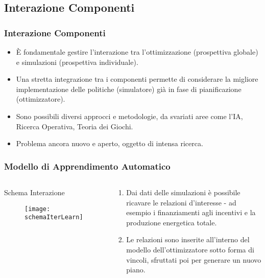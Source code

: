 \documentclass{beamer}
\begin{document}
\subsection{Interazione Componenti}
	\begin{frame}
		\frametitle{Interazione Componenti}
		\begin{itemize}
			\item \`E fondamentale gestire l'interazione tra l'ottimizzazione (prospettiva globale) e simulazioni (prospettiva individuale).
			\item Una stretta integrazione tra i componenti permette di considerare la migliore implementazione delle politiche (simulatore) già in fase di pianificazione (ottimizzatore).
			\item Sono possibili diversi approcci e metodologie, da svariati aree come l'IA, Ricerca Operativa, Teoria dei Giochi.
			\item Problema ancora nuovo e aperto, oggetto di intensa ricerca.
		\end{itemize}
  	\end{frame}
  	\begin{frame}
		\frametitle{Modello di Apprendimento Automatico}
		\begin{columns}
		\begin{block}{Schema Interazione}
			\begin{figure}[htb]
				\centering
				\texttt{[image: schemaIterLearn]}
			  	\label{schemaIterLearn}
			\end{figure}
		\end{block}
		\begin{block}{}
			\begin{enumerate}
				\item Dai dati delle simulazioni è possibile ricavare le relazioni d'interesse - ad esempio i finanziamenti agli incentivi e la produzione energetica totale.
				\item Le relazioni sono inserite all'interno del modello dell'ottimizzatore sotto forma di vincoli, sfruttati poi per generare un nuovo piano.
			\end{enumerate}
		\end{block}
		\end{columns}
		
	\end{frame}
\end{document}
